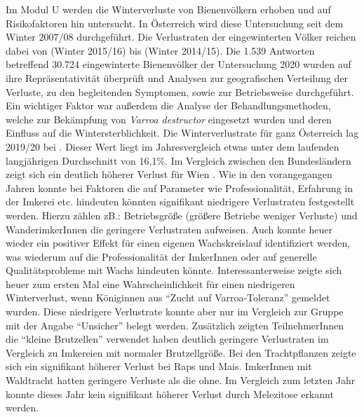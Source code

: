 Im Modul U werden die Winterverluste von Bienenvölkern erhoben und auf Risikofaktoren hin untersucht. In Österreich wird diese Untersuchung seit dem Winter 2007/08 durchgeführt. Die Verlustraten der eingewinterten Völker reichen dabei von  (Winter 2015/16) bis  (Winter 2014/15). 
\newline
Die 1.539 Antworten betreffend 30.724 eingewinterte Bienenvölker der Untersuchung 2020 wurden auf ihre Repräsentativität überprüft und Analysen zur geografischen Verteilung der Verluste, zu den begleitenden Symptomen, sowie zur Betriebsweise durchgeführt. Ein wichtiger Faktor war außerdem die Analyse der Behandlungsmethoden, welche zur Bekämpfung von \textit{Varroa destructor} eingesetzt wurden und deren Einfluss auf die Wintersterblichkeit.
\newline
Die Winterverlustrate für ganz Österreich lag 2019/20 bei . Dieser Wert liegt im Jahresvergleich etwas unter dem laufenden langjährigen Durchschnitt von 16,1\%. Im Vergleich zwischen den Bundesländern zeigt sich ein deutlich höherer Verlust für Wien .
\newline
Wie in den vorangegangen Jahren konnte bei Faktoren die auf Parameter wie Professionalität, Erfahrung in der Imkerei etc. hindeuten könnten signifikant niedrigere Verlustraten festgestellt werden. Hierzu zählen zB.: Betriebsgröße (größere Betriebe weniger Verluste) und WanderimkerInnen die geringere Verlustraten aufweisen. Auch konnte heuer wieder ein positiver Effekt für einen eigenen Wachskreislauf identifiziert werden, was wiederum auf die Professionalität der ImkerInnen oder auf generelle Qualitätsprobleme mit Wachs hindeuten könnte. 
\newline
Interessanterweise zeigte sich heuer zum ersten Mal eine Wahrscheinlichkeit für einen niedrigeren Winterverlust, wenn Königinnen aus \enquote{Zucht auf Varroa-Toleranz} gemeldet wurden. Diese niedrigere Verlustrate konnte aber nur im Vergleich zur Gruppe mit der Angabe \enquote{Unsicher} belegt werden. Zusätzlich zeigten TeilnehmerInnen die \enquote{kleine Brutzellen} verwendet haben deutlich geringere Verlustraten im Vergleich zu Imkereien mit normaler Brutzellgröße.
\newline
Bei den Trachtpflanzen zeigte sich ein signifikant höherer Verlust bei Raps und Mais. ImkerInnen mit Waldtracht hatten geringere Verluste als die ohne. Im Vergleich zum letzten Jahr konnte dieses Jahr kein signifikant höherer Verlust durch Melezitose erkannt werden. 
